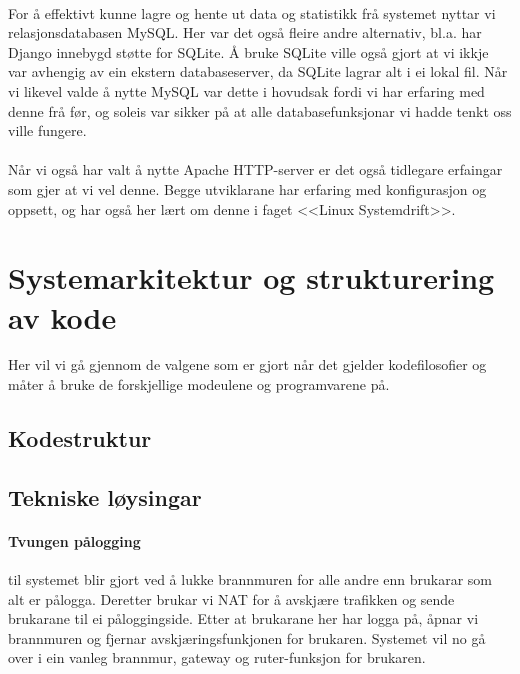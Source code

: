 \documentclass[nynorsk,12pt,a4paper,oneside]{book}
\begin{document}
\paragraph{}
For å effektivt kunne lagre og hente ut data og statistikk frå systemet nyttar vi relasjonsdatabasen MySQL. Her var det også fleire andre alternativ, bl.a. har Django innebygd støtte for SQLite. Å bruke SQLite ville også gjort at vi ikkje var avhengig av ein ekstern databaseserver, da SQLite lagrar alt i ei lokal fil. Når vi likevel valde å nytte MySQL var dette i hovudsak fordi vi har erfaring med denne frå før, og soleis var sikker på at alle databasefunksjonar vi hadde tenkt oss ville fungere.  
\paragraph{}
Når vi også har valt å nytte Apache HTTP-server er det også tidlegare erfaingar som gjer at vi vel denne. Begge utviklarane har erfaring med konfigurasjon og oppsett, og har også her lært om denne i faget <<Linux Systemdrift>>. 

\paragraph{}

\section{Systemarkitektur og strukturering av kode}
Her vil vi gå gjennom de valgene som er gjort når det gjelder kodefilosofier og måter å bruke de forskjellige modeulene og programvarene på.

\subsection{Kodestruktur}

\subsection{Tekniske løysingar}
\paragraph{Tvungen pålogging} til systemet blir gjort ved å lukke brannmuren for alle andre enn brukarar som alt er pålogga. Deretter brukar vi NAT for å avskjære trafikken og sende brukarane til ei påloggingside. Etter at brukarane her har logga på, åpnar vi brannmuren og fjernar avskjæringsfunkjonen for brukaren. Systemet vil no gå over i ein vanleg brannmur, gateway og ruter-funksjon for brukaren. 
\end{document}
